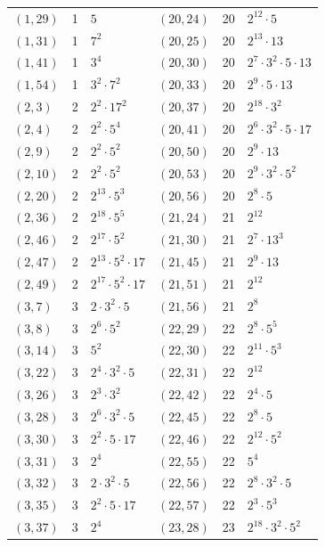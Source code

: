 \documentclass[11pt]{article}
\begin{document}
\begin{longtable}{@{}lrl@{\qquad}lrl@{}}
$(1,29)$ & 1 & $5$ & $(20,24)$ & 20 & $2^{12}\cdot 5$\\
$(1,31)$ & 1 & $7^{2}$ & $(20,25)$ & 20 & $2^{13}\cdot 13$\\
$(1,41)$ & 1 & $3^{4}$ & $(20,30)$ & 20 & $2^{7}\cdot 3^{2}\cdot 5\cdot 13$\\
$(1,54)$ & 1 & $3^{2}\cdot 7^{2}$ & $(20,33)$ & 20 & $2^{9}\cdot 5\cdot 13$\\
$(2,3)$ & 2 & $2^{2}\cdot 17^{2}$ & $(20,37)$ & 20 & $2^{18}\cdot 3^{2}$\\
$(2,4)$ & 2 & $2^{2}\cdot 5^{4}$ & $(20,41)$ & 20 & $2^{6}\cdot 3^{2}\cdot 5\cdot 17$\\
$(2,9)$ & 2 & $2^{2}\cdot 5^{2}$ & $(20,50)$ & 20 & $2^{9}\cdot 13$\\
$(2,10)$ & 2 & $2^{2}\cdot 5^{2}$ & $(20,53)$ & 20 & $2^{9}\cdot 3^{2}\cdot 5^{2}$\\
$(2,20)$ & 2 & $2^{13}\cdot 5^{3}$ & $(20,56)$ & 20 & $2^{8}\cdot 5$\\
$(2,36)$ & 2 & $2^{18}\cdot 5^{5}$ & $(21,24)$ & 21 & $2^{12}$\\
$(2,46)$ & 2 & $2^{17}\cdot 5^{2}$ & $(21,30)$ & 21 & $2^{7}\cdot 13^{3}$\\
$(2,47)$ & 2 & $2^{13}\cdot 5^{2}\cdot 17$ & $(21,45)$ & 21 & $2^{9}\cdot 13$\\
$(2,49)$ & 2 & $2^{17}\cdot 5^{2}\cdot 17$ & $(21,51)$ & 21 & $2^{12}$\\
$(3,7)$ & 3 & $2\cdot 3^{2}\cdot 5$ & $(21,56)$ & 21 & $2^{8}$\\
$(3,8)$ & 3 & $2^{6}\cdot 5^{2}$ & $(22,29)$ & 22 & $2^{8}\cdot 5^{5}$\\
$(3,14)$ & 3 & $5^{2}$ & $(22,30)$ & 22 & $2^{11}\cdot 5^{3}$\\
$(3,22)$ & 3 & $2^{4}\cdot 3^{2}\cdot 5$ & $(22,31)$ & 22 & $2^{12}$\\
$(3,26)$ & 3 & $2^{3}\cdot 3^{2}$ & $(22,42)$ & 22 & $2^{4}\cdot 5$\\
$(3,28)$ & 3 & $2^{6}\cdot 3^{2}\cdot 5$ & $(22,45)$ & 22 & $2^{8}\cdot 5$\\
$(3,30)$ & 3 & $2^{2}\cdot 5\cdot 17$ & $(22,46)$ & 22 & $2^{12}\cdot 5^{2}$\\
$(3,31)$ & 3 & $2^{4}$ & $(22,55)$ & 22 & $5^{4}$\\
$(3,32)$ & 3 & $2\cdot 3^{2}\cdot 5$ & $(22,56)$ & 22 & $2^{8}\cdot 3^{2}\cdot 5$\\
$(3,35)$ & 3 & $2^{2}\cdot 5\cdot 17$ & $(22,57)$ & 22 & $2^{3}\cdot 5^{3}$\\
$(3,37)$ & 3 & $2^{4}$ & $(23,28)$ & 23 & $2^{18}\cdot 3^{2}\cdot 5^{2}$\\

\end{longtable}
\end{document}
